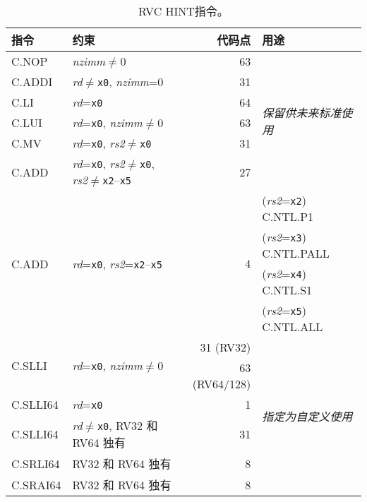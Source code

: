 \begin{table}[hbt]
\centering
\begin{tabular}{|l|l|r|l|}
  \hline
  指令                     & 约束                                        & 代码点        & 用途 \\ \hline \hline
  C.NOP                   & {\em nzimm}$\neq$0                          & 63          & \multirow{6}{*}{\em 保留供未来标准使用} \\ \cline{1-3}
  C.ADDI                  & {\em rd}$\neq${\tt x0}, {\em nzimm}=0       & 31          & \\ \cline{1-3}
  C.LI                    & {\em rd}={\tt x0}                           & 64          & \\ \cline{1-3}
  C.LUI                   & {\em rd}={\tt x0}, {\em nzimm}$\neq$0       & 63          & \\ \cline{1-3}
  C.MV                    & {\em rd}={\tt x0}, {\em rs2}$\neq${\tt x0}  & 31          & \\ \cline{1-3}
  C.ADD                   & {\em rd}={\tt x0}, {\em rs2}$\neq${\tt x0}, {\em rs2}$\neq${\tt x2}--{\tt x5} & 27   & \\ \hline
  \multirow{4}{*}{C.ADD}  & \multirow{4}{*}{{\em rd}={\tt x0}, {\em rs2}={\tt x2}--{\tt x5}}
                                                                        & \multirow{4}{*}{$4$}
                                                                                      & ({\em rs2}={\tt x2}) C.NTL.P1 \\
                          &                                             &             & ({\em rs2}={\tt x3}) C.NTL.PALL \\
                          &                                             &             & ({\em rs2}={\tt x4}) C.NTL.S1 \\
                          &                                             &             & ({\em rs2}={\tt x5}) C.NTL.ALL \\ \hline
  \multirow{2}{*}{C.SLLI} & \multirow{2}{*}{{\em rd}={\tt x0}, {\em nzimm}$\neq$0} & 31 (RV32)   & \multirow{6}{*}{\em 指定为自定义使用} \\
                          &                                             & 63 (RV64/128) & \\ \cline{1-3}
  C.SLLI64                & {\em rd}={\tt x0}                           & 1           & \\ \cline{1-3}
  C.SLLI64                & {\em rd}$\neq${\tt x0}, RV32 和 RV64 独有  & 31          & \\ \cline{1-3}
  C.SRLI64                & RV32 和 RV64 独有                          & 8           & \\ \cline{1-3}
  C.SRAI64                & RV32 和 RV64 独有                          & 8           & \\ \hline
\end{tabular}
\caption{RVC HINT指令。}
\label{tab:rvc-hints}
\end{table}

